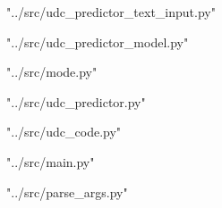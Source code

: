 \centerline{"../src/udc\_predictor\_text\_input.py"}

\centerline{"../src/udc\_predictor\_model.py"}

\centerline{"../src/mode.py"}

\centerline{"../src/udc\_predictor.py"}

\centerline{"../src/udc\_code.py"}

\centerline{"../src/main.py"}

\centerline{"../src/parse\_args.py"}

